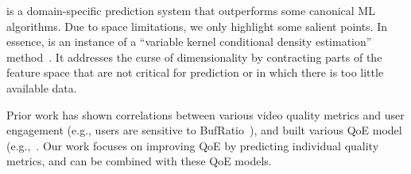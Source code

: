 \dda is a domain-specific prediction system that outperforms some 
canonical ML algorithms. 
Due to space limitations, we only highlight some salient points. 
In essence, \dda is an instance of a ``variable kernel conditional 
density estimation'' method~\cite{terrell1992variable}. 
It addresses the curse of dimensionality by contracting parts of 
the feature space that are not critical for prediction or in which 
there is too little available data.


Prior work has shown correlations between various video quality 
metrics and user engagement (e.g., users are sensitive to 
BufRatio~\cite{sigcomm11}),
and built various QoE model (e.g.,~\cite{akamai-imc12,qscore,
sigcomm13athula,aggarwal2014prometheus}. 
Our work focuses on improving QoE by predicting individual 
quality metrics, and can be combined with these QoE models.
